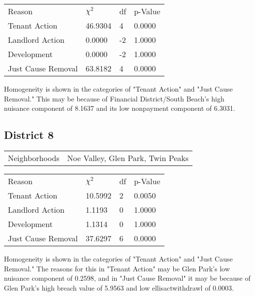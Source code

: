 \documentclass[]{article}
\begin{document}
\begin {table}[!h]
\centering
\begin{tabular}{l | l | l | l}
	
	Reason				 &  $\chi ^{2}$ & df & p-Value \\
	Tenant Action 		   &  46.9304  & 4  & 0.0000 \\
	Landlord Action	       &  0.0000  & -2  & 1.0000 \\
	Development			   &  0.0000  & -2  & 1.0000 \\
	Just Cause Removal	   &  63.8182  & 4  & 0.0000 \\
\end{tabular} \newline
\end{table}
\FloatBarrier

Homogeneity is shown in the categories of "Tenant Action" and "Just Cause Removal." This may be because of Financial District/South Beach's high nuisance component of 8.1637 and its low nonpayment component of 6.3031.

\subsection{District 8}

\begin{table}[!h]
	\centering
	\begin{tabular}{l | l}
		Neighborhoods & Noe Valley, Glen Park, Twin Peaks
	\end{tabular}
\end{table}
\FloatBarrier

\begin {table}[!h]
\centering
\begin{tabular}{l | l | l | l}
	
	Reason				 &  $\chi ^{2}$ & df & p-Value \\
	Tenant Action 		   &  10.5992  &  2 & 0.0050 \\
	Landlord Action	       &  1.1193  &  0 & 1.0000 \\
	Development			   &  1.1314  & 0  & 1.0000 \\
	Just Cause Removal	   &  37.6297  &  6 & 0.0000 \\
\end{tabular} \newline
\end{table}
\FloatBarrier

Homogeneity is shown in the categories of "Tenant Action" and "Just Cause Removal." The reasons for this in "Tenant Action" may be Glen Park's low nuisance component of 0.2598, and in "Just Cause Removal" it may be because of Glen Park's high breach value of 5.9563 and low ellisactwithdrawl of 0.0003.
\end{document}
